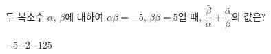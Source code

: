 두 복소수 $\alpha$, $\beta$에 대하여 $\alpha\beta=-5$, $\beta\bar{\beta}=5$일 때, $\dfrac{\bar{\beta}}{\alpha}+\dfrac{\bar{\alpha}}{\beta}$의 값은? 
\begin{choices32}{$-5$}{$-2$}{$-1$}{$2$}{$5$}\end{choices32}
